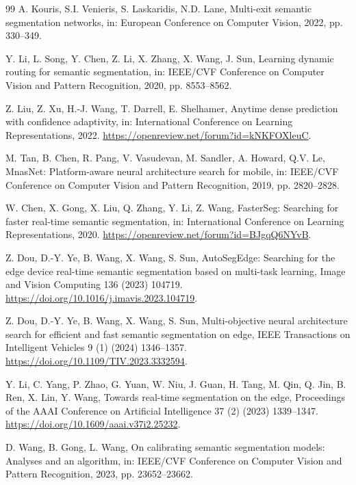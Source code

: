 \documentclass[a4paper,review,12pt]{elsarticle}
\begin{document}
\begin{thebibliography}{99}
A. Kouris, S.I. Venieris, S. Laskaridis, N.D. Lane,
Multi-exit semantic segmentation networks,
in: European Conference on Computer Vision, 2022, pp. 330--349.

Y. Li, L. Song, Y. Chen, Z. Li, X. Zhang, X. Wang, J. Sun,
Learning dynamic routing for semantic segmentation,
in: IEEE/CVF Conference on Computer Vision and Pattern Recognition, 2020, pp. 8553--8562.

Z. Liu, Z. Xu, H.-J. Wang, T. Darrell, E. Shelhamer,
Anytime dense prediction with confidence adaptivity,
in: International Conference on Learning Representations, 2022.
\url{https://openreview.net/forum?id=kNKFOXleuC}.

M. Tan, B. Chen, R. Pang, V. Vasudevan, M. Sandler, A. Howard, Q.V. Le,
MnasNet: Platform-aware neural architecture search for mobile,
in: IEEE/CVF Conference on Computer Vision and Pattern Recognition, 2019, pp. 2820--2828.

W. Chen, X. Gong, X. Liu, Q. Zhang, Y. Li, Z. Wang,
FasterSeg: Searching for faster real-time semantic segmentation,
in: International Conference on Learning Representations, 2020.
\url{https://openreview.net/forum?id=BJgqQ6NYvB}.

Z. Dou, D.-Y. Ye, B. Wang, X. Wang, S. Sun,
AutoSegEdge: Searching for the edge device real-time semantic segmentation based on multi-task learning,
Image and Vision Computing 136 (2023) 104719.
\url{https://doi.org/10.1016/j.imavis.2023.104719}.

Z. Dou, D.-Y. Ye, B. Wang, X. Wang, S. Sun,
Multi-objective neural architecture search for efficient and fast semantic segmentation on edge,
IEEE Transactions on Intelligent Vehicles 9 (1) (2024) 1346--1357.
\url{https://doi.org/10.1109/TIV.2023.3332594}.

Y. Li, C. Yang, P. Zhao, G. Yuan, W. Niu, J. Guan, H. Tang, M. Qin, Q. Jin, B. Ren, X. Lin, Y. Wang,
Towards real-time segmentation on the edge,
Proceedings of the AAAI Conference on Artificial Intelligence 37 (2) (2023) 1339--1347.
\url{https://doi.org/10.1609/aaai.v37i2.25232}.

D. Wang, B. Gong, L. Wang,
On calibrating semantic segmentation models: Analyses and an algorithm,
in: IEEE/CVF Conference on Computer Vision and Pattern Recognition, 2023, pp. 23652--23662.


\end{thebibliography}
\end{document}
